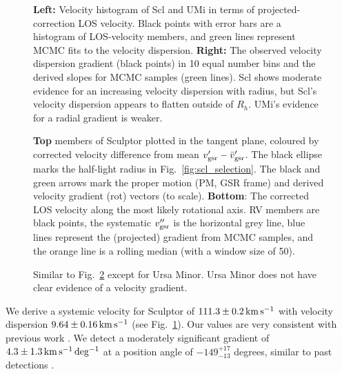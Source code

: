 \begin{figure}
\centering
{}
\caption[Velocity dispersion fits]{\textbf{Left:} Velocity histogram of
Scl and UMi in terms of projected-correction LOS velocity. Black points
with error bars are a histogram of LOS-velocity members, and green lines
represent MCMC fits to the velocity dispersion. \textbf{Right:} The
observed velocity dispersion gradient (black points) in 10 equal number
bins and the derived slopes for MCMC samples (green lines). Scl shows
moderate evidence for an increasing velocity dispersion with radius, but
Scl's velocity dispersion appears to flatten outside of \(R_h\). UMi's
evidence for a radial gradient is weaker.}\label{fig:rv_hists}
\end{figure}



\begin{figure}
\centering
{}
\caption[A possible velocity gradient in Sculptor]{\textbf{Top} members
of Sculptor plotted in the tangent plane, coloured by corrected velocity
difference from mean \(v_{\rm gsr}' - \bar v_{\rm gsr}'\). The black
ellipse marks the half-light radius in Fig.~\ref{fig:scl_selection}. The
black and green arrows mark the proper motion (PM, GSR frame) and
derived velocity gradient (rot) vectors (to scale). \textbf{Bottom}: The
corrected LOS velocity along the most likely rotational axis. RV members
are black points, the systematic \(v_{\rm gsr}''\) is the horizontal
grey line, blue lines represent the (projected) gradient from MCMC
samples, and the orange line is a rolling median (with a window size of
50).}\label{fig:scl_velocity_gradient_scatter}
\end{figure}

\begin{figure}
\centering
{}
\caption[velocity]{Similar to
Fig.~\ref{fig:scl_velocity_gradient_scatter} except for Ursa Minor. Ursa
Minor does not have clear evidence of a velocity
gradient.}\label{fig:umi_velocity_gradient_scatter}
\end{figure}

We derive a systemic velocity for Sculptor of \(111.3\pm0.2\,{\rm km\,s^{-1}}\) with
velocity dispersion \(9.64\pm0.16\,{\rm km\,s^{-1}}\) (see Fig.~\ref{fig:rv_hists}).
Our values are very consistent with previous work
\citep[e.g.,][]{walker+2009, arroyo-polonio+2024, battaglia+2008}. We
detect a moderately significant gradient of \(4.3\pm1.3\,{\rm km\,s^{-1}\,deg^{-1}}\) at a
position angle of \(-149_{-13}^{+17}\) degrees, similar to past
detections
\citetext{\citealp[e.g.,][]{arroyo-polonio+2024}; \citealp{battaglia+2008}; \citealp[but
see also][]{strigari2010}; \citealp{martinez-garcia+2023}}.

